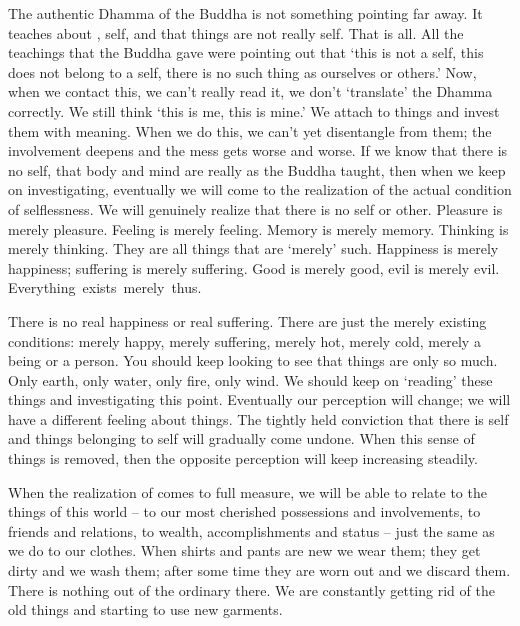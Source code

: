 The authentic Dhamma of the Buddha is not something pointing far away. It teaches about , self, and that things are not really self. That is all. All the teachings that the Buddha gave were pointing out that `this is not a self, this does not belong to a self, there is no such thing as ourselves or others.' Now, when we contact this, we can't really read it, we don't `translate' the Dhamma correctly. We still think `this is me, this is mine.' We attach to things and invest them with meaning. When we do this, we can't yet disentangle from them; the involvement deepens and the mess gets worse and worse. If we know that there is no self, that body and mind are really  as the Buddha taught, then when we keep on investigating, eventually we will come to the realization of the actual condition of selflessness. We will genuinely realize that there is no self or other. Pleasure is merely pleasure. Feeling is merely feeling. Memory is merely memory. Thinking is merely thinking. They are all things that are `merely' such. Happiness is merely happiness; suffering is merely suffering. Good is merely good, evil is merely evil. \mbox{Everything exists merely thus.}

There is no real happiness or real suffering. There are just the merely existing conditions: merely happy, merely suffering, merely hot, merely cold, merely a being or a person. You should keep looking to see that things are only so much. Only earth, only water, only fire, only wind. We should keep on `reading' these things and investigating this point. Eventually our perception will change; we will have a different feeling about things. The tightly held conviction that there is self and things belonging to self will gradually come undone. When this sense of things is removed, then the opposite perception will keep increasing steadily. 

When the realization of  comes to full measure, we will be able to relate to the things of this world -- to our most cherished possessions and involvements, to friends and relations, to wealth, accomplishments and status -- just the same as we do to our clothes. When shirts and pants are new we wear them; they get dirty and we wash them; after some time they are worn out and we discard them. There is nothing out of the ordinary there. We are constantly getting rid of the old things and starting to use new garments. 

